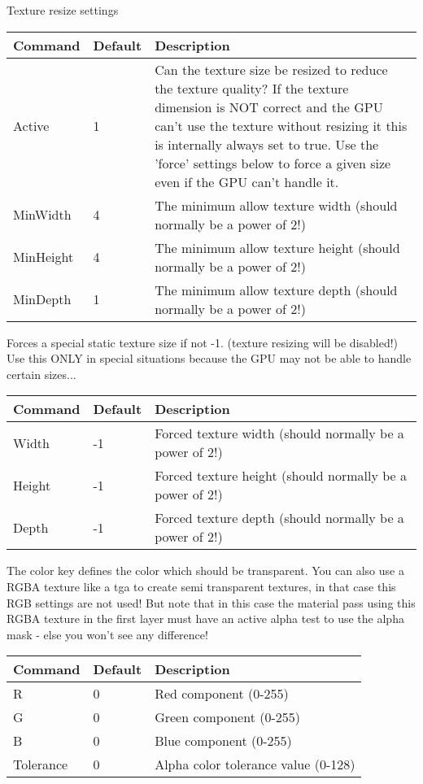 Texture resize settings\\

\begin{tabular}{|p{2.5cm}|p{2.5cm}|p{9cm}|}
\hline
\textbf{Command} & \textbf{Default} & \textbf{Description}\\
\hline
Active	  & 1 & Can the texture size be resized to reduce the texture quality? If the texture dimension
                is NOT correct and the GPU can't use the texture without resizing it this is internally
                always set to true. Use the 'force' settings below to force a given size even if the GPU
                can't handle it.\\
\hline
MinWidth  & 4 & The minimum allow texture width (should normally be a power of 2!)\\
\hline
MinHeight & 4 & The minimum allow texture height (should normally be a power of 2!)\\
\hline
MinDepth  & 1 & The minimum allow texture depth (should normally be a power of 2!)\\
\hline
\end{tabular}


Forces a special static texture size if not -1. (texture resizing will be disabled!)\\
Use this ONLY in special situations because the GPU may not be able to handle certain
sizes...

\begin{tabular}{|p{2.5cm}|p{2.5cm}|p{9cm}|}
\hline
\textbf{Command} & \textbf{Default} & \textbf{Description}\\
\hline
Width  & -1 & Forced texture width (should normally be a power of 2!)\\
\hline
Height & -1 & Forced texture height (should normally be a power of 2!)\\
\hline
Depth  & -1 & Forced texture depth (should normally be a power of 2!)\\
\hline
\end{tabular}


The color key defines the color which should be transparent.
You can also use a RGBA texture like a tga to create semi transparent textures, in that
case this RGB settings are not used! But note that in this case the material pass using this
RGBA texture in the first layer must have an active alpha test to use the alpha mask - else
you won't see any difference!\\

\begin{tabular}{|p{2.5cm}|p{2.5cm}|p{9cm}|}
\hline
\textbf{Command} & \textbf{Default} & \textbf{Description}\\
\hline
R		  & 0 & Red component (0-255)\\
\hline
G		  & 0 & Green component (0-255)\\
\hline
B		  & 0 & Blue component (0-255)\\
\hline
Tolerance & 0 & Alpha color tolerance value (0-128)\\
\hline
\end{tabular}



